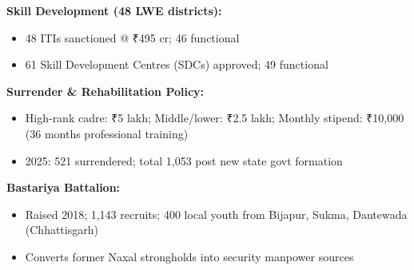 \textbf{Skill Development (48 LWE districts):}
\begin{itemize}
  \item 48 ITIs sanctioned @ ₹495 cr; 46 functional
  \item 61 Skill Development Centres (SDCs) approved; 49 functional
\end{itemize}

\textbf{Surrender \& Rehabilitation Policy:}
\begin{itemize}
  \item High-rank cadre: ₹5 lakh; Middle/lower: ₹2.5 lakh; Monthly stipend: ₹10,000 (36 months professional training)
  \item 2025: 521 surrendered; total 1,053 post new state govt formation
\end{itemize}

\textbf{Bastariya Battalion:}
\begin{itemize}
  \item Raised 2018; 1,143 recruits; 400 local youth from Bijapur, Sukma, Dantewada (Chhattisgarh)
  \item Converts former Naxal strongholds into security manpower sources
\end{itemize}
